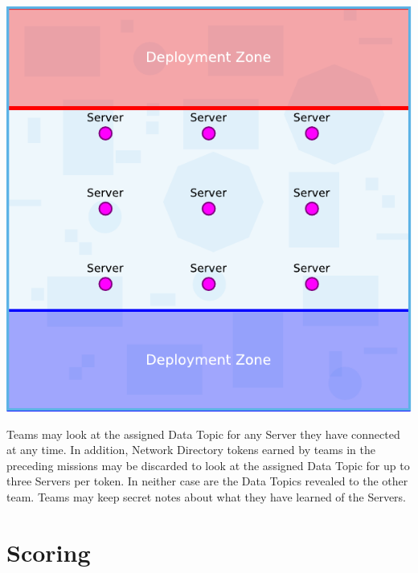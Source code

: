 \begin{minipage}[t]{4in}\centering
\vspace{4pt}   
\includegraphics{maps/map-datacenter}
\end{minipage}

Teams may look at the assigned Data Topic for any Server they have
connected at any time.  In addition, Network Directory tokens earned
by teams in the preceding missions may be discarded to look at the
assigned Data Topic for up to three Servers per token.  In neither
case are the Data Topics revealed to the other team.  Teams may keep
secret notes about what they have learned of the Servers.

\section{Scoring}

